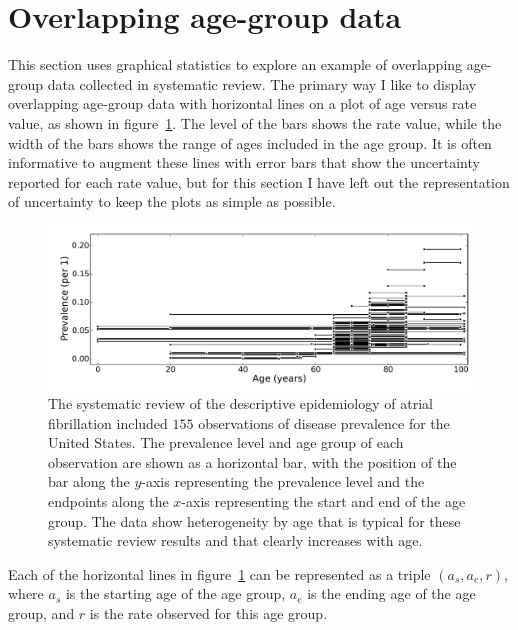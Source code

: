 \section{Overlapping age-group data}
\label{theory-age_group_model-overlapping_data}
This section uses graphical statistics to explore an example of overlapping age-group data
collected in systematic review.  The
primary way I like to display overlapping age-group data with horizontal
lines on a plot of age versus rate value, as shown in
figure~\ref{theory-age_group_model-dismod_data_plot}.  The level of the bars shows
the rate value, while the width of the bars shows the range of ages
included in the age group. It is often informative to augment these
lines with error bars that show the uncertainty reported for each rate
value, but for this section I have left out the representation of
uncertainty to keep the plots as simple as possible.

\begin{figure}[ht]
\begin{center}
\includegraphics[width=\textwidth]{af_ages_intervals.pdf}
\caption[Systematic review data for atrial fibrillation.]{The 
  systematic review of the descriptive epidemiology of
  atrial fibrillation included $155$ observations of disease prevalence for the United States.
 The prevalence level and age group of
  each observation are shown as a horizontal bar, with the
  position of the bar along the $y$-axis representing the prevalence
  level and the endpoints along the $x$-axis representing the start and
  end of the age group.  The data show heterogeneity by age that is
  typical for these systematic review results and that clearly increases
 with age.  }
\label{theory-age_group_model-dismod_data_plot}
\end{center}
\end{figure}

Each of the horizontal lines in
figure~\ref{theory-age_group_model-dismod_data_plot} can be
represented as a triple $({a_s}, {a_e}, r)$, where $a_s$ is the
starting age of the age group, $a_e$ is the ending age of the
age group, and $r$ is the rate observed for this age group.

